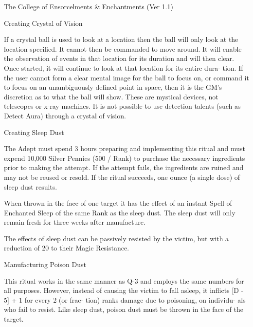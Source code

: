\begin{Chapter}{The College of Ensorcelments \& Enchantments (Ver 1.1)}
\begin{ritual}[Q-2]{Creating Crystal of Vision }
\begin{effects}
If a crystal ball is used to look at a location then the ball will
only look at the location specified.  It cannot then be commanded to
move around. It will enable the observation of events in that location
for its duration and will then clear. Once started, it will continue
to look at that location for its entire dura- tion.  If the user
cannot form a clear mental image for the ball to focus on, or command
it to focus on an unambiguously defined point in space, then it is the
GM’s discretion as to what the ball will show.  These are mystical
devices, not telescopes or x-ray machines. It is not possible to use
detection talents (such as Detect Aura) through a crystal of vision.
\end{effects}
\end{ritual}

\begin{ritual}[Q-3]{Creating Sleep Dust }

\begin{effects}
The Adept must spend 3 hours preparing and implementing this ritual
and must expend 10,000 Silver Pennies (500 / Rank) to purchase the
necessary ingredients prior to making the attempt.  If the attempt
fails, the ingredients are ruined and may not be reused or resold. If
the ritual succeeds, one ounce (a single dose) of sleep dust results.

When thrown in the face of one target it has the effect of an instant
Spell of Enchanted Sleep of the same Rank as the sleep dust.  The
sleep dust will only remain fresh for three weeks after manufacture.

The effects of sleep dust can be passively resisted by the victim, but
with a reduction of 20 to their Magic Resistance.
\end{effects}
\end{ritual}

\begin{ritual}[Q-4]{Manufacturing Poison Dust }
\begin{effects}
This ritual works in the same manner as Q-3 and employs the same
numbers for all purposes.  However, instead of causing the victim to
fall asleep, it inflicts [D - 5] + 1 for every 2 (or frac- tion) ranks
damage due to poisoning, on individu- als who fail to resist.  Like
sleep dust, poison dust must be thrown in the face of the target.
\end{effects}
\end{ritual}



\end{Chapter}
